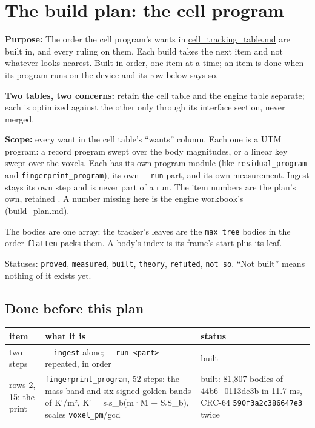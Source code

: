 \chapter{\texorpdfstring{The build plan: the cell program}{The build plan: the cell program}}
\label{chap:build-plan}

\textbf{Purpose:} The order the cell program's wants in \hyperref[chap:cell-tracking-table]{cell\_\allowbreak{}tracking\_\allowbreak{}table.md} are built in, and every ruling on them. Each build takes the next item and not whatever looks nearest. Built in order, one item at a time; an item is done when its program runs on the device and its row below says so.

\textbf{Two tables, two concerns:} retain the cell table and the engine table separate; each is optimized against the other only through its interface section, never merged.

\textbf{Scope:} every want in the cell table's “wants” column. Each one is a UTM program: a record program swept over the body magnitudes, or a linear key swept over the voxels. Each has its own program module (like \texttt{residual\_\allowbreak{}program} and \texttt{fingerprint\_\allowbreak{}program}), its own \texttt{-\allowbreak{}-\allowbreak{}run} part, and its own measurement. Ingest stays its own step and is never part of a run. The item numbers are the plan's own, retained . A number missing here is the engine workbook's (build\_\allowbreak{}plan.md).

The bodies are one array: the tracker's leaves are the \texttt{max\_\allowbreak{}tree} bodies in the order \texttt{flatten} packs them. A body's index is its frame's start plus its leaf.

Statuses: \texttt{proved}, \texttt{measured}, \texttt{built}, \texttt{theory}, \texttt{refuted}, \texttt{not so}. “Not built” means nothing of it exists yet.

\section{\texorpdfstring{Done before this plan}{Done before this plan}}

{\small
\setlength{\tabcolsep}{6pt}
\begin{longtable}{>{\RaggedRight\arraybackslash}p{}>{\RaggedRight\arraybackslash}p{}>{\RaggedRight\arraybackslash}p{}}
\toprule
item & what it is & status \\
\midrule
\endhead
two steps & \texttt{-\allowbreak{}-\allowbreak{}ingest} alone; \texttt{-\allowbreak{}-\allowbreak{}run <part>} repeated, in order & built \\
rows 2, 15: the print & \texttt{fingerprint\_\allowbreak{}program}, 52 steps: the mass band and six signed golden bands of K′/m², K′ = sₐs\_\allowbreak{}b(m·M − SₐS\_\allowbreak{}b), scales \texttt{voxel\_\allowbreak{}pm}/gcd & built: 81,807 bodies of 44b6\_\allowbreak{}0113de3b in 11.7 ms, CRC-64 \texttt{590f3a2c386647e3} twice \\
\bottomrule
\end{longtable}
}

